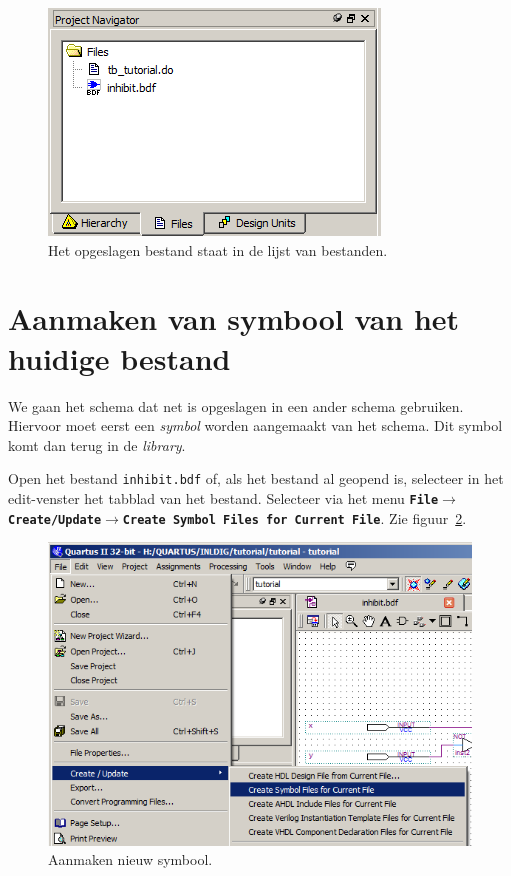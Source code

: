 \documentclass[a4paper,12pt,fleqn,twoside]{book}
\def\tutpicscale{0.455}
\newcommand{\menu}[1]{\texttt{\textbf{#1}}}
\def\pijl{$\rightarrow$}%
\begin{document}
\begin{figure}[H]
\centering
\includegraphics[scale=\tutpicscale]{031fileinproject}
\caption{Het opgeslagen bestand staat in de lijst van bestanden.}
\label{fig:031fileinproject}
\end{figure}


\section{Aanmaken van symbool van het huidige bestand}
\label{sec:aanmakenvansymboolvanhethuidigebestand}
We gaan het schema dat net is opgeslagen in een ander schema gebruiken.
Hiervoor moet eerst een \textsl{symbol} worden aangemaakt van het schema.
Dit symbol komt dan terug in de \textsl{library}. 
 
Open het bestand \lstinline|inhibit.bdf| of, als het bestand al geopend is,
selecteer in het edit-venster het tabblad van het bestand. Selecteer via het
menu \menu{File\pijl{}Create/Update\pijl{}Create Symbol Files for Current File}.
Zie figuur~\ref{fig:033createsymbolfiles}.

\begin{figure}[H]
\centering
\includegraphics[scale=\tutpicscale]{033createsymbolfiles}
\caption{Aanmaken nieuw symbool.}
\label{fig:033createsymbolfiles}
\end{figure}
\end{document}

